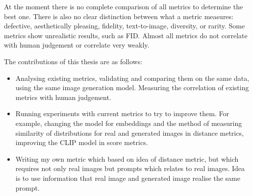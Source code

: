 At the moment there is no complete comparison of all metrics to determine the best one. There is also no clear distinction between what a metric measures: defective, aesthetically pleasing, fidelity, text-to-image, diversity, or rarity. Some metrics show unrealistic results, such as FID. Almost all metrics do not correlate with human judgement or correlate very weakly.

 The contributions of this thesis are as follows:
 \begin{itemize}
  \item Analysing existing metrics, validating and comparing them on the same data, using the same image generation model. Measuring the correlation of existing metrics with human judgement.
  \item Running experiments with current metrics to try to improve them. For example, changing the model for embeddings and the method of measuring similarity of distributions for real and generated images in distance metrics, improving the CLIP model in score metrics.
  \item Writing my own metric which based on idea of distance metric, but which requires not only real images but prompts which relates to real images. Idea is to use information that real image and generated image realise the same prompt.
\end{itemize}





